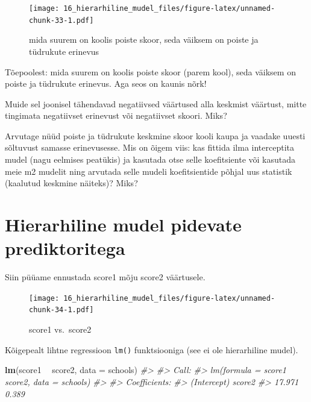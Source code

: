 \documentclass[]{book}
\newenvironment{Shaded}{\begin{snugshade}}{\end{snugshade}}
\newcommand{\KeywordTok}[1]{\textcolor[rgb]{0.13,0.29,0.53}{\textbf{#1}}}
\newcommand{\DataTypeTok}[1]{\textcolor[rgb]{0.13,0.29,0.53}{#1}}
\newcommand{\StringTok}[1]{\textcolor[rgb]{0.31,0.60,0.02}{#1}}
\newcommand{\CommentTok}[1]{\textcolor[rgb]{0.56,0.35,0.01}{\textit{#1}}}
\newcommand{\OperatorTok}[1]{\textcolor[rgb]{0.81,0.36,0.00}{\textbf{#1}}}
\newcommand{\NormalTok}[1]{#1}
\begin{document}
\begin{figure}
\centering
\texttt{[image: 16\_hierarhiline\_mudel\_files/figure-latex/unnamed-chunk-33-1.pdf]}
\caption{\label{fig:unnamed-chunk-33}mida suurem on koolis poiste skoor,
seda väiksem on poiste ja tüdrukute erinevus}
\end{figure}

Tõepoolest: mida suurem on koolis poiste skoor (parem kool), seda
väiksem on poiste ja tüdrukute erinevus. Aga seos on kaunis nõrk!

Muide sel joonisel tähendavad negatiivsed väärtused alla keskmist
väärtust, mitte tingimata negatiivset erinevust või negatiivset skoori.
Miks?

Arvutage nüüd poiste ja tüdrukute keskmine skoor kooli kaupa ja vaadake
uuesti sõltuvust samasse erinevusesse. Mis on õigem viis: kas fittida
ilma interceptita mudel (nagu eelmises peatükis) ja kasutada otse selle
koefitsiente või kasutada meie m2 mudelit ning arvutada selle mudeli
koefitsientide põhjal uus statistik (kaalutud keskmine näiteks)? Miks?

\section{Hierarhiline mudel pidevate
prediktoritega}\label{hierarhiline-mudel-pidevate-prediktoritega}

Siin püüame ennustada score1 mõju score2 väärtusele.

\begin{Shaded}
\end{Shaded}

\begin{figure}
\centering
\texttt{[image: 16\_hierarhiline\_mudel\_files/figure-latex/unnamed-chunk-34-1.pdf]}
\caption{\label{fig:unnamed-chunk-34}score1 vs.~score2}
\end{figure}

Kõigepealt lihtne regressioon \texttt{lm()} funktsiooniga (see ei ole
hierarhiline mudel).

\begin{Shaded}
\begin{Highlighting}[]
\KeywordTok{lm}\NormalTok{(score1 }\OperatorTok{~}\StringTok{ }\NormalTok{score2, }\DataTypeTok{data =}\NormalTok{ schools)}
\CommentTok{#> }
\CommentTok{#> Call:}
\CommentTok{#> lm(formula = score1 ~ score2, data = schools)}
\CommentTok{#> }
\CommentTok{#> Coefficients:}
\CommentTok{#> (Intercept)       score2  }
\CommentTok{#>      17.971        0.389}
\end{Highlighting}
\end{Shaded}
\end{document}
